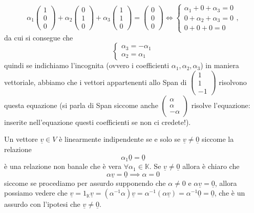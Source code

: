 \begin{example}
    $$
        \alpha_1 \begin{pmatrix} 1 \\ 0 \\ 0 \end{pmatrix} + \alpha_2 \begin{pmatrix} 0 \\ 1 \\ 0 \end{pmatrix} + \alpha_3 \begin{pmatrix} 1 \\ 1 \\ 0 \end{pmatrix} = \begin{pmatrix} 0 \\ 0 \\ 0 \end{pmatrix} \iff \begin{cases} \alpha_1 + 0 + \alpha_3 = 0 \\ 0 + \alpha_2 + \alpha_3 = 0 \\ 0 + 0 + 0 = 0 \end{cases},
    $$
    da cui si consegue che
    $$
    \begin{cases}
        \alpha_3 = - \alpha_1 \\
        \alpha_2 = \alpha_1
    \end{cases}
    $$
    quindi se indichiamo l'incognita (ovvero i coefficienti $\alpha_1, \alpha_2, \alpha_3$) in maniera vettoriale, abbiamo che i vettori appartenenti allo Span di $\begin{pmatrix} 1 \\ 1 \\ - 1 \end{pmatrix}$ risolvono questa equazione (si parla di Span siccome anche $\begin{pmatrix} \alpha \\ \alpha \\ -\alpha \end{pmatrix}$ risolve l'equazione: inserite nell'equazione questi coefficienti se non ci credete!).
\end{example}
\begin{remark}
    Un vettore $\underline{v} \in V$ è linearmente indipendente se e solo se $\underline{v} \neq \underline{0}$ siccome la relazione
    $$
        \alpha_1 \underline{0} = \underline{0}
    $$
    è una relazione non banale che è vera $\forall \alpha_1 \in \mathbb{K}$. Se $\underline{v} \neq \underline{0}$ allora è chiaro che
    $$
        \alpha \underline{v} = \underline{0} \implies \alpha = 0
    $$
    siccome se procediamo per assurdo supponendo che $\alpha \neq 0$ e $\alpha \underline{v} = \underline{0}$, allora possiamo vedere che $\underline{v} = 1_\mathbb{K} \underline{v} = (\alpha^{-1} \alpha) \underline{v} = \alpha^{-1} (\alpha \underline{v}) = \alpha^{-1} \underline{0} = \underline{0}$, che è un assurdo con l'ipotesi che $\underline{v} \neq \underline{0}$.
\end{remark}
